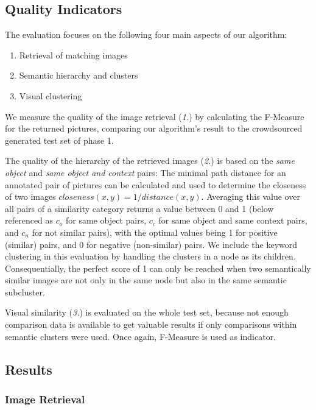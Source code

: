 \subsection{Quality Indicators}
The evaluation focuses on the following four main aspects of our algorithm:
\begin{enumerate}
\item Retrieval of matching images
\item Semantic hierarchy and clusters
\item Visual clustering
\end{enumerate}

We measure the quality of the image retrieval (\emph{1.}) by calculating the F-Measure for the returned pictures, comparing our algorithm's result to the crowdsourced generated test set of phase 1.  

The quality of the hierarchy of the retrieved images (\emph{2.}) is based on the \emph{same object} and \emph{same object and context} pairs: The  minimal path distance for an annotated pair of pictures can be calculated and used to determine the closeness of two images $closeness(x,y) = 1/distance(x,y)$. Averaging this value over all pairs of a similarity category returns a value between 0 and 1 (below referenced as $c_o$ for same object pairs, $c_c$ for same object and same context pairs, and $c_n$ for not similar pairs), with the optimal values being 1 for positive (similar) pairs, and 0 for negative (non-similar) pairs. 
We include the keyword clustering in this evaluation by handling the clusters in a node as its children. Consequentially, the perfect score of 1 can only be reached when two semantically similar images are not only in the same node but also in the same semantic subcluster.

Visual similarity (\emph{3.}) is evaluated on the whole test set, because not enough comparison data is available to get valuable results if only comparisons within semantic clusters were used. Once again, F-Measure is used as indicator.


\subsection{Results}
\label{sec_results}

\subsubsection*{Image Retrieval}


